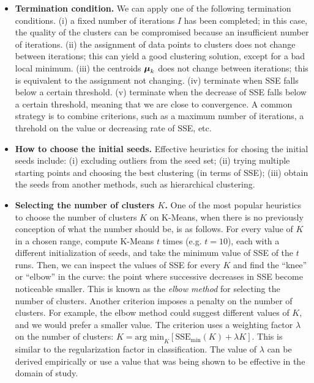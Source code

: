 \begin{itemize}
\item {\bf Termination condition.} 
%
We can apply one of the following termination conditions.
%
(i) a fixed number of iterations $I$ has been completed; 
%
in this case, the quality of the clusters can be compromised because an
insufficient number of iterations.
%
(ii) the assignment of data points to clusters does not change between
iterations; 
%
this can yield a good clustering solution, except for a bad local minimum.
%
(iii) the centroids $\boldsymbol{\mathbf{\mu}}_k$ does not change between iterations;
%
this is equivalent to the assignment not changing.
%
(iv) terminate when SSE falls below a certain threshold.
%
(v) terminate when the decrease of SSE falls below a certain threshold, meaning
that we are close to convergence.
%
A common strategy is to combine criterions, such as a maximum number of
iterations, a threhold on the value or decreasing rate of SSE, etc.

\item {\bf How to choose the initial seeds.} 
%
Effective heuristics for chosing the initial seeds include:
%
(i) excluding outliers from the seed set;
%
(ii) trying multiple starting points and choosing the best clustering (in terms
of SSE);
%
(iii) obtain the seeds from another methods, such as hierarchical clustering.

\item {\bf Selecting the number of clusters $K$.}
%
One of the most popular heuristics to choose the number of clusters $K$ on
K-Means, when there is no previously conception of what the number should be, is
as follows.
%
For every value of $K$ in a chosen range, compute K-Means $t$ times (e.g. $t =
10$), each with a different initialization of seeds, and take the minimum value
of SSE of the $t$ runs.
%
Then, we can inspect the values of SSE for every $K$ and find the ``knee'' or
``elbow'' in the curve: the point where successive decreases in SSE become
noticeable smaller.
%
This is known as the {\em elbow method} for selecting the number of clusters.
%
Another criterion imposes a penalty on the number of clusters.
%
For example, the elbow method could suggest different values of $K$, and we
would prefer a smaller value.
%
The criterion uses a weighting factor $\lambda$ on the number of clusters: $K =
\text{arg min}_K [\text{SSE}_{\text{min}}(K) + \lambda K]$.
%
This is similar to the regularization factor in classification.
%
The value of $\lambda$ can be derived empirically or use a value that was being
shown to be effective in the domain of study.
\end{itemize}

